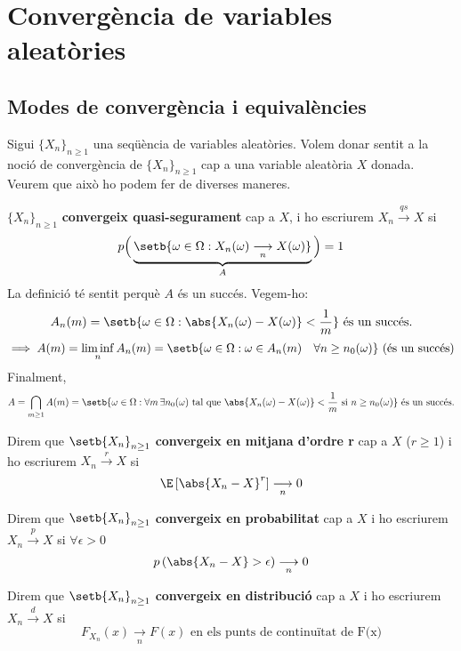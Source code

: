 \section{Convergència de variables aleatòries}

\subsection{Modes de convergència i equivalències}

Sigui $\{X_n\}_{n\geq1}$ una seqüència de variables aleatòries. Volem donar sentit a la noció de convergència de $\{X_n\}_{n\geq1}$ cap a una variable aleatòria $X$ donada.\\
Veurem que això ho podem fer de diverses maneres.

\begin{defi}
  $\{X_n\}_{n\geq1}$ \textbf{convergeix quasi-segurament} cap a $X$, i ho  escriurem $X_n \overset{qs}{\longrightarrow} X$ si
  \[
    p\Big(\underbrace{\setb{\omega \in \Omega : X_n(\omega)\underset{n}{\longrightarrow}X(\omega)}}_{A}\Big) = 1
  \]
  La definició té sentit perquè $A$ és un succés. Vegem-ho:
  \[
    A_n(m) = \setb{\omega \in \Omega : \abs{X_n(\omega) - X(\omega)} < \frac{1}{m}} \text{ és un succés.}
  \]
  \[
    \implies A(m) = \liminf_n A_n(m) = \setb{\omega \in \Omega : \omega \in A_n(m) \quad \forall n \geq n_0(\omega)} \text{ (és un succés)}
  \]
  Finalment,
  \[
    A = \bigcap_{m\geq1}A(m) = \setb{\omega\in\Omega : \forall m \, \exists n_0(\omega) \text{ tal que } \abs{X_n(\omega) - X(\omega)} < \frac{1}{m} \text{ si } n \geq n_0(\omega)} \text{ és un succés.}
  \]
\end{defi}

\begin{defi}
  Direm que $\setb{X_n}_{n\geq1}$ \textbf{convergeix en mitjana d'ordre r} cap a $X$ ($r \geq 1$) i ho escriurem $X_n \overset{r}{\longrightarrow} X$ si
  \[
    \E\left[\abs{X_n - X}^r\right] \underset{n}{\longrightarrow} 0
  \]
\end{defi}

\begin{defi}
  Direm que $\setb{X_n}_{n\geq1}$ \textbf{convergeix en probabilitat} cap a $X$ i ho escriurem $X_n \overset{p}{\longrightarrow} X$ si $\forall \epsilon > 0$
  \[
    p\left(\abs{X_n - X} > \epsilon \right) \underset{n}{\longrightarrow} 0
  \]
\end{defi}

\begin{defi}
  Direm que $\setb{X_n}_{n\geq1}$ \textbf{convergeix en distribució} cap a $X$ i ho escriurem $X_n \overset{d}{\longrightarrow} X$ si
  \[
    F_{X_n}(x) \underset{n}{\longrightarrow} F(x) \text{ en els punts de continuïtat de F(x)}
  \]
\end{defi}

